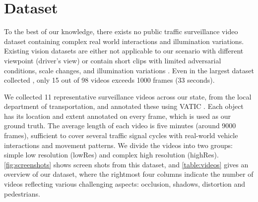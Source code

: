 \section{Dataset}
To the best of our knowledge, there exists no public traffic surveillance video dataset containing complex real world interactions and illumination variations. 
Existing vision datasets are either not applicable to our scenario with different viewpoint (driver's view) \cite{sivaraman2010general} 
or contain short clips with limited adversarial conditions, scale changes, and illumination variations \cite{manen2014appearances,wu2015object}. %
Even in the largest dataset collected \cite{wu2015object}, only 15 out of 98 videos exceeds 1000 frames (33 seconds).%

We collected 11 representative surveillance videos across our state, from the local department of transportation, and annotated these using VATIC \cite{springerlink:10.1007/s11263-012-0564-1}. Each object has its location and extent annotated on every frame, which is used as our ground truth. The average length of each video is five minutes (around 9000 frames), sufficient to cover several traffic signal cycles with real-world vehicle interactions and movement patterns. We divide the videos into two groups: simple low resolution (lowRes) and complex high resolution (highRes). \ref{fig:screenshots} shows screen shots from this dataset, and \ref{table:videos} gives an overview of our dataset, where the rightmost four columns indicate the number of videos reflecting various challenging aspects: occlusion, shadows, distortion and pedestrians.

